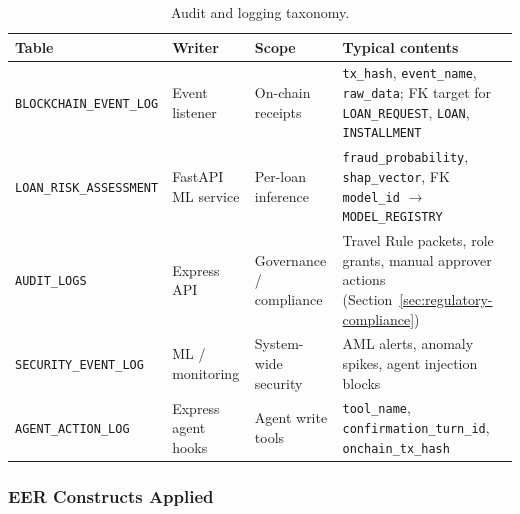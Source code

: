 \begin{table}[H]
\centering
\small
\setlength{\tabcolsep}{4pt}
\renewcommand{\arraystretch}{1.12}
\caption[Audit and logging taxonomy]{Audit and logging taxonomy.}
\label{tab:db-audit-taxonomy}
\begin{tabular}{@{}>{\raggedright\arraybackslash}p{3.4cm}>{\raggedright\arraybackslash}p{2.2cm}>{\raggedright\arraybackslash}p{3.2cm}>{\raggedright\arraybackslash}p{4.7cm}@{}}
\toprule
\tableheadcolor
\tableheadfont Table &
\tableheadfont Writer &
\tableheadfont Scope &
\tableheadfont Typical contents \\
\midrule
\texttt{BLOCKCHAIN\_EVENT\_LOG} &
  Event listener &
  On-chain receipts &
  \texttt{tx\_hash}, \texttt{event\_name}, \texttt{raw\_data}; FK target for \texttt{LOAN\_REQUEST}, \texttt{LOAN}, \texttt{INSTALLMENT} \\
\rowcolor{RowShade}
\texttt{LOAN\_RISK\_ASSESSMENT} &
  FastAPI ML service &
  Per-loan inference &
  \texttt{fraud\_probability}, \texttt{shap\_vector}, FK \texttt{model\_id} $\to$ \texttt{MODEL\_REGISTRY} \\
\texttt{AUDIT\_LOGS} &
  Express API &
  Governance / compliance &
  Travel Rule packets, role grants, manual approver actions (Section~\ref{sec:regulatory-compliance}) \\
\rowcolor{RowShade}
\texttt{SECURITY\_EVENT\_LOG} &
  ML / monitoring &
  System-wide security &
  AML alerts, anomaly spikes, agent injection blocks \\
\texttt{AGENT\_ACTION\_LOG} &
  Express agent hooks &
  Agent write tools &
  \texttt{tool\_name}, \texttt{confirmation\_turn\_id}, \texttt{onchain\_tx\_hash} \\
\bottomrule
\end{tabular}
\end{table}

\subsubsection{EER Constructs Applied}

